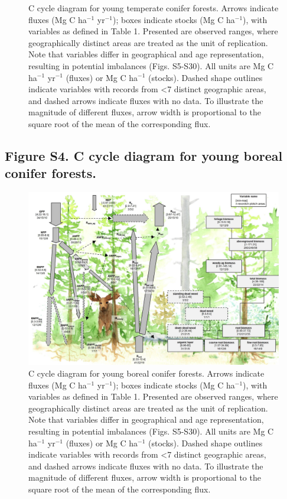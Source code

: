 \documentclass[
]{article}
\begin{document}
\begin{landscape}
\begin{figure}[H]
{}

\caption{ C cycle diagram for young temperate conifer forests. Arrows indicate fluxes (Mg C ha$^{-1}$ yr$^{-1}$); boxes indicate stocks (Mg C ha$^{-1}$), with variables as defined in Table 1. Presented are observed ranges, where geographically distinct areas are treated as the unit of replication. Note that variables differ in geographical and age representation, resulting in potential imbalances (Figs. S5-S30). All units are Mg C ha$^{-1}$ yr$^{-1}$ (fluxes) or Mg C ha$^{-1}$ (stocks). Dashed shape outlines indicate variables with records from <7 distinct geographic areas, and dashed arrows indicate fluxes with no data. To illustrate the magnitude of different fluxes, arrow width is proportional to the square root of the mean of the corresponding flux.}\label{fig:unnamed-chunk-6}
\end{figure}

\hypertarget{figure-s4.-c-cycle-diagram-for-young-boreal-conifer-forests.}{%
\subsection{Figure S4. C cycle diagram for young boreal conifer
forests.}\label{figure-s4.-c-cycle-diagram-for-young-boreal-conifer-forests.}}

\begin{figure}[H]

{\centering \includegraphics[width=0.84\linewidth]{tables_figures/C_cycle_diagrams/Boreal_conifer_YOUNG} 

}

\caption{C cycle diagram for young boreal conifer forests. Arrows indicate fluxes (Mg C ha$^{-1}$ yr$^{-1}$); boxes indicate stocks (Mg C ha$^{-1}$), with variables as defined in Table 1. Presented are observed ranges, where geographically distinct areas are treated as the unit of replication. Note that variables differ in geographical and age representation, resulting in potential imbalances (Figs. S5-S30). All units are Mg C ha$^{-1}$ yr$^{-1}$ (fluxes) or Mg C ha$^{-1}$ (stocks). Dashed shape outlines indicate variables with records from <7 distinct geographic areas, and dashed arrows indicate fluxes with no data. To illustrate the magnitude of different fluxes, arrow width is proportional to the square root of the mean of the corresponding flux.}\label{fig:unnamed-chunk-7}
\end{figure}
\end{landscape}
\end{document}

